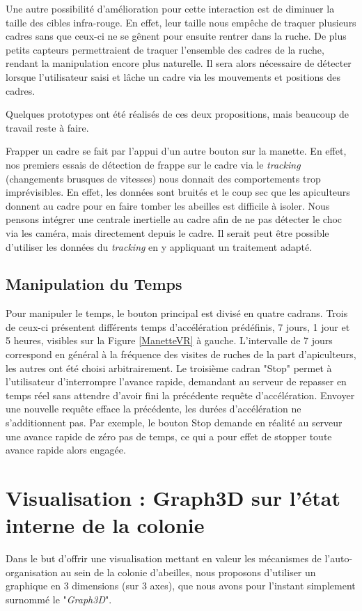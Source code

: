 		Une autre possibilité d'amélioration pour cette interaction est de diminuer la taille des cibles infra-rouge. En effet, leur taille nous empêche de traquer plusieurs cadres sans que ceux-ci ne se gênent pour ensuite rentrer dans la ruche. De plus petits capteurs permettraient de traquer l'ensemble des cadres de la ruche, rendant la manipulation encore plus naturelle. Il sera alors nécessaire de détecter lorsque l'utilisateur saisi et lâche un cadre via les mouvements et positions des cadres.
		
		Quelques prototypes ont été réalisés de ces deux propositions, mais beaucoup de travail reste à faire.
		
		Frapper un cadre se fait par l'appui d'un autre bouton sur la manette. En effet, nos premiers essais de détection de frappe sur le cadre via le \textit{tracking} (changements brusques de vitesses) nous donnait des comportements trop imprévisibles. En effet, les données sont bruités et le coup sec que les apiculteurs donnent au cadre pour en faire tomber les abeilles est difficile à isoler. Nous pensons intégrer une centrale inertielle au cadre afin de ne pas détecter le choc via les caméra, mais directement depuis le cadre. Il serait peut être possible d'utiliser les données du \textit{tracking} en y appliquant un traitement adapté.
		
		\subsection{Manipulation du Temps}
		
		Pour manipuler le temps, le bouton principal est divisé en quatre cadrans. Trois de ceux-ci présentent différents temps d'accélération prédéfinis, 7 jours, 1 jour et 5 heures, visibles sur la Figure \ref{ManetteVR} à gauche. L'intervalle de 7 jours correspond en général à la fréquence des visites de ruches de la part d'apiculteurs, les autres ont été choisi arbitrairement. Le troisième cadran "Stop" permet à l'utilisateur d'interrompre l'avance rapide, demandant au serveur de repasser en temps réel sans attendre d'avoir fini la précédente requête d'accélération. Envoyer une nouvelle requête efface la précédente, les durées d'accélération ne s'additionnent pas. Par exemple, le bouton Stop demande en réalité au serveur une avance rapide de zéro pas de temps, ce qui a pour effet de stopper toute avance rapide alors engagée.
		
	\section{Visualisation : Graph3D sur l'état interne de la colonie}
		Dans le but d'offrir une visualisation mettant en valeur les mécanismes de l'auto-organisation au sein de la colonie d'abeilles, nous proposons d'utiliser un graphique en 3 dimensions (sur 3 axes), que nous avons pour l'instant simplement surnommé le "\textit{Graph3D}".
		

